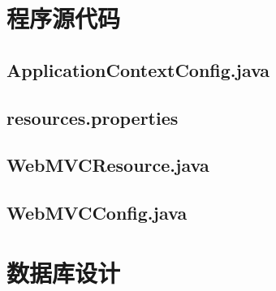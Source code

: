 
\chapter{程序源代码}
\section{ApplicationContextConfig.java}\label{sec:ApplicationContextConfig}

\section{resources.properties}\label{sec:resources}

\section{WebMVCResource.java}\label{sec:WebMVCResource}

\section{WebMVCConfig.java}\label{sec:WebMVCConfig}

\chapter{数据库设计}\label{sec:databasediagram}
